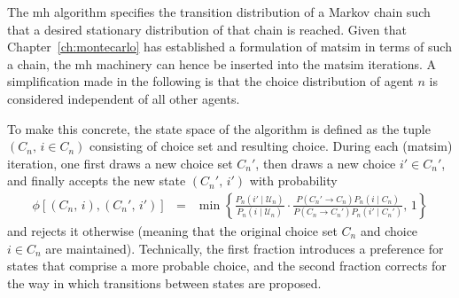 The \gls{mh} algorithm specifies the transition distribution
of a Markov chain such that a desired stationary distribution of that
chain is reached. Given that Chapter~\ref{ch:montecarlo} has established
a formulation of \gls{matsim} in terms of such a chain, the \gls{mh} machinery can
hence be inserted into the \gls{matsim} iterations. A simplification made in
the following is that the choice distribution of agent $n$ is considered
independent of all other agents.

To make this concrete, the state space of the algorithm is defined as the tuple
$(C_{n},\, i\in C_{n})$ consisting of choice set and resulting choice.
During each (\gls{matsim}) iteration, one first draws a new choice set $C_{n}'$,
then draws a new choice $i'\in C_{n}'$, and finally accepts the new
state $(C_{n}',\, i')$ with probability
\begin{eqnarray}
\phi[(C_{n},\, i),(C_{n}',\, i')] 
& = & 
\min\left\{ 
\frac{{\displaystyle P_{n}(i'\mid \mathcal{U}_n)}}
{{\displaystyle P_{n}(i\mid \mathcal{U}_n)}}
\cdot
\frac{{P(C_{n}'\rightarrow C_{n})P_n(i\mid C_{n})}}
{{P(C_{n}\rightarrow C_{n}')P_n(i'\mid C_{n}')}}
,\,1\right\} 
\label{eq:accept-proba-1}
\end{eqnarray}
and rejects it otherwise (meaning that the original choice set $C_{n}$
and choice $i\in C_{n}$ are maintained).
Technically, the first fraction introduces a preference for states
that comprise a more probable choice, and the second
fraction corrects for the way in which transitions between states are
proposed.


